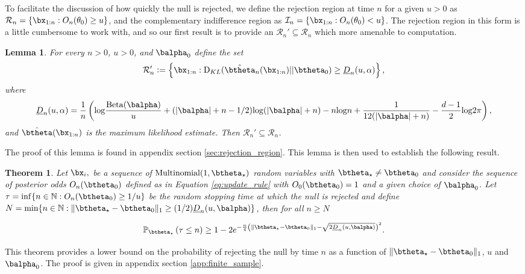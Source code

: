 \documentclass[11pt]{article}
\def\log{{\rm log}}
\newcommand{\Beta}{\mathrm{Beta}}
\newcommand{\KL}{\mathrm{D}_{KL}}
\newtheorem{thm}{Theorem}[section]
\newtheorem{lemma}{Lemma}[section]
\newcommand{\df}{\vcentcolon=}
\begin{document}
To facilitate the discussion of how quickly the null is rejected, we define the rejection region at time $n$ for a given $u>0$ as $\mathcal{R}_n = \{ \bx_{1:n} : O_n(\theta_0) \geq u \}$,
and the complementary indifference region as $\mathcal{I}_n = \{ \bx_{1:n} : O_n(\theta_0) < u \}$. 
The rejection region in this form is a little cumbersome to work with,
and so our first result is to provide an $\mathcal R_n'\subseteq \mathcal R_n$ which more amenable to computation.
\begin{lemma}\label{thm:calRprime}
  For every $n>0$, $u>0$, and $\balpha_0$ define the set
  \begin{equation}
    \label{eq:decision_boundary}
    \mathcal R_n'\df 
    \left\{
      \bx_{1:n} :
      \KL(\hat\btheta_n(\bx_{1:n})|| \btheta_0)
      \geq \underline{D}_n(u,\alpha) 
    \right\},
  \end{equation}
  where
  \begin{equation*}
    \underline{D}_n(u,\alpha) = \frac{1}{n}\left( \log \frac{\Beta(\balpha)}{u} +(|\balpha|+n-1/2)\log(|\balpha|+n)-n\log n + \frac{1}{12(|\balpha|+n)} - \frac{d-1}{2}\log 2\pi\right),
  \end{equation*}
  and $\hat{\btheta}(\bx_{1:n})$ is the maximum likelihood estimate.
Then $\mathcal{R}_n'  \subseteq \mathcal R_n$.
\end{lemma}
The proof of this lemma is found in appendix section \ref{sec:rejection_region}.
This lemma is then used to establish the following result.


\begin{thm}
  \label{thm:finite_sample}
\noindent Let $\bx_i,$ be a sequence of $\text{Multinomial}(1,\btheta_{\star})$ random variables with $\btheta_{\star} \neq \btheta_0$ and consider the sequence of posterior odds $O_n(\btheta_0)$ defined as in Equation \eqref{eq:update_rule} with $O_0(\btheta_0)=1$ and a given choice of $\balpha_0$.
Let $\tau = \inf \lbrace n \in \mathbb{N}: O_n(\btheta_0) \geq 1/u \rbrace$ be the random stopping time at which the null is rejected and define $N = \min \{n \in \mathbb{N} : \|\btheta_\star - \btheta_0\|_1 \geq (1/2)\underline{D}_n(u,\balpha)\}$, then for all $n\geq N$

\begin{equation}
  \label{eq:finite_sample}
\mathbb{P}_{\btheta_{\star}}\left( \tau \leq  n \right) \geq
 1 -2e^{-\frac{n}{4}\left(\|\btheta_\star - \btheta_0\|_1-\sqrt{2\underline{D}_n(u,\balpha)}\right)^2}.
\end{equation}
\end{thm}
\noindent This theorem provides a lower bound on the probability of rejecting the null by time $n$ as a function of $\|\btheta_\star - \btheta_0\|_1$, $u$ and $\balpha_0$.
The proof is given in appendix section \ref{app:finite_sample}. 
\end{document}
